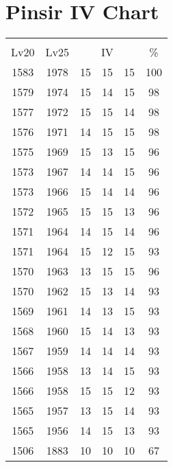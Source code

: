 \documentclass{article}%
\begin{document}
%
\normalsize%
\section{Pinsir IV Chart}%
\label{sec:Pinsir IV Chart}%
\renewcommand{\arraystretch}{1.5}%
\begin{tabular}{|c|c|c|c|c|c|}%
\hline%
\multicolumn{6}{|c|}{\textcolor{white}{ 
\linebreak{Pinsir}
}%
\cellcolor{black}}\\%
\multicolumn{1}{|c}{Lv20}&\multicolumn{1}{c|}{Lv25}&\multicolumn{3}{c|}{IV}&\multicolumn{1}{|c|}{\%}\\%
\hline%
\rowcolor{color100}%
1583&1978&15&15&15&100\\%
\hline%
\rowcolor{color98}%
1579&1974&15&14&15&98\\%
\hline%
\rowcolor{color98}%
1577&1972&15&15&14&98\\%
\hline%
\rowcolor{color98}%
1576&1971&14&15&15&98\\%
\hline%
\rowcolor{color96}%
1575&1969&15&13&15&96\\%
\hline%
\rowcolor{color96}%
1573&1967&14&14&15&96\\%
\hline%
\rowcolor{color96}%
1573&1966&15&14&14&96\\%
\hline%
\rowcolor{color96}%
1572&1965&15&15&13&96\\%
\hline%
\rowcolor{color96}%
1571&1964&14&15&14&96\\%
\hline%
\rowcolor{color93}%
1571&1964&15&12&15&93\\%
\hline%
\rowcolor{color96}%
1570&1963&13&15&15&96\\%
\hline%
\rowcolor{color93}%
1570&1962&15&13&14&93\\%
\hline%
\rowcolor{color93}%
1569&1961&14&13&15&93\\%
\hline%
\rowcolor{color93}%
1568&1960&15&14&13&93\\%
\hline%
\rowcolor{color93}%
1567&1959&14&14&14&93\\%
\hline%
\rowcolor{color93}%
1566&1958&13&14&15&93\\%
\hline%
\rowcolor{color93}%
1566&1958&15&15&12&93\\%
\hline%
\rowcolor{color93}%
1565&1957&13&15&14&93\\%
\hline%
\rowcolor{color93}%
1565&1956&14&15&13&93\\%
\hline%
\rowcolor{color91}%
1506&1883&10&10&10&67\\%
\end{tabular}

%
\end{document}
